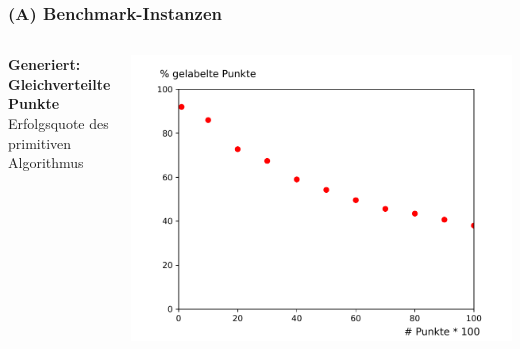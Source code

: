 \documentclass[aspectratio=169]{beamer}
\begin{document}
\begin{frame}
	\frametitle{(A) Benchmark-Instanzen}
	\begin{columns}[c] %
	
	\textbf{Generiert: Gleichverteilte Punkte}\\
	Erfolgsquote des primitiven Algorithmus
	
	
	\includegraphics[scale=.45]{random_solve.pdf}
	

	\end{columns}
	\end{frame}

\end{document}
